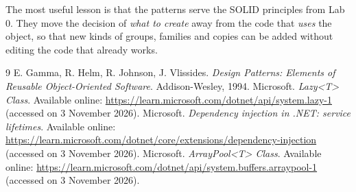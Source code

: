 \documentclass{utmreport}
\begin{document}
The most useful lesson is that the patterns serve the SOLID principles from Lab 0. They move the decision of \emph{what to create} away from the code that \emph{uses} the object, so that new kinds of groups, families and copies can be added without editing the code that already works.


\begin{thebibliography}{9}
 E. Gamma, R. Helm, R. Johnson, J. Vlissides. \textit{Design Patterns: Elements of Reusable Object-Oriented Software}. Addison-Wesley, 1994.
 Microsoft. \textit{Lazy<T> Class}. Available online: \url{https://learn.microsoft.com/dotnet/api/system.lazy-1} (accessed on 3 November 2026).
 Microsoft. \textit{Dependency injection in .NET: service lifetimes}. Available online: \url{https://learn.microsoft.com/dotnet/core/extensions/dependency-injection} (accessed on 3 November 2026).
 Microsoft. \textit{ArrayPool<T> Class}. Available online: \url{https://learn.microsoft.com/dotnet/api/system.buffers.arraypool-1} (accessed on 3 November 2026).
\end{thebibliography}
\end{document}
